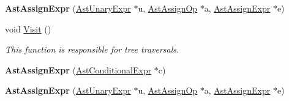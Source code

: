 \begin{DoxyCompactItemize}
\item 
\hypertarget{classAstAssignExpr_abbbd7c531a5c6fdecde141f46699f375}{{\bfseries Ast\-Assign\-Expr} (\hyperlink{classAstUnaryExpr}{Ast\-Unary\-Expr} $\ast$u, \hyperlink{classAstAssignOp}{Ast\-Assign\-Op} $\ast$a, \hyperlink{classAstAssignExpr}{Ast\-Assign\-Expr} $\ast$e)}\label{classAstAssignExpr_abbbd7c531a5c6fdecde141f46699f375}

\item 
void \hyperlink{classAstAssignExpr_a7e86da39b9d65e34a16314c0927b78d9}{Visit} ()
\begin{DoxyCompactList}\small\item\em This function is responsible for tree traversals. \end{DoxyCompactList}\item 
\hypertarget{classAstAssignExpr_adcf8fd9d2e80a579e8fad5ae28c79211}{{\bfseries Ast\-Assign\-Expr} (\hyperlink{classAstConditionalExpr}{Ast\-Conditional\-Expr} $\ast$c)}\label{classAstAssignExpr_adcf8fd9d2e80a579e8fad5ae28c79211}

\item 
\hypertarget{classAstAssignExpr_abbbd7c531a5c6fdecde141f46699f375}{{\bfseries Ast\-Assign\-Expr} (\hyperlink{classAstUnaryExpr}{Ast\-Unary\-Expr} $\ast$u, \hyperlink{classAstAssignOp}{Ast\-Assign\-Op} $\ast$a, \hyperlink{classAstAssignExpr}{Ast\-Assign\-Expr} $\ast$e)}\label{classAstAssignExpr_abbbd7c531a5c6fdecde141f46699f375}


\end{DoxyCompactItemize}
